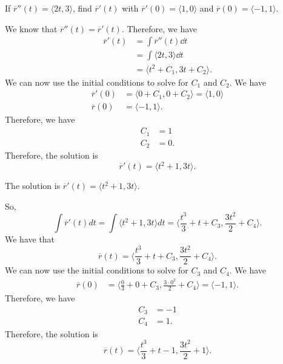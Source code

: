 \documentclass{article}
\begin{document}
\renewcommand{\familydefault}{\rmdefault}



\setcounter{page}{0}
\newpage
\tableofcontents
\newpage






\normalsize

\setcounter{page}{1}

\begin{examplebox}
If \( \overline{r}''(t) = \langle 2t, 3 \rangle \), find \( \overline{r}'(t) \) with \( \overline{r}'(0) = \langle 1, 0 \rangle \) and \( \overline{r}(0) = \langle -1, 1 \rangle \).
\begin{solutionbox}
We know that \( \overline{r}''(t) = \overline{r}'(t) \). Therefore, we have
\begin{align*}
    \overline{r}'(t) &= \int \overline{r}''(t) \dd{t} \\
    &= \int \langle 2t, 3 \rangle \dd{t} \\
    &= \langle t^2 + C_1, 3t + C_2 \rangle.
\end{align*}
We can now use the initial conditions to solve for \( C_1 \) and \( C_2 \). We have
\begin{align*}
    \overline{r}'(0) &= \langle 0 + C_1, 0 + C_2 \rangle = \langle 1, 0 \rangle \\
    \overline{r}(0) &= \langle -1, 1 \rangle.
\end{align*}
Therefore, we have
\begin{align*}
    C_1 &= 1 \\
    C_2 &= 0.
\end{align*}
Therefore, the solution is
\begin{equation*}
    \overline{r}'(t) = \langle t^2 + 1, 3t \rangle.
\end{equation*}
\begin{answerbox}
The solution is \( \overline{r}'(t) = \langle t^2 + 1, 3t \rangle \).
\end{answerbox}
\end{solutionbox}
\end{examplebox}
So,
\[
    \int \overline{r}'(t) dt = \int \langle t^2 + 1, 3t \rangle dt = \langle \frac{t^3}{3} + t + C_3, \frac{3t^2}{2} + C_4 \rangle.
\]
We have that
\[
    \overline{r}(t) = \langle \frac{t^3}{3} + t + C_3, \frac{3t^2}{2} + C_4 \rangle.
\]
We can now use the initial conditions to solve for \( C_3 \) and \( C_4 \). We have
\begin{align*}
    \overline{r}(0) &= \langle \frac{0}{3} + 0 + C_3, \frac{3 \cdot 0^2}{2} + C_4 \rangle = \langle -1, 1 \rangle.
\end{align*}
Therefore, we have
\begin{align*}
    C_3 &= -1 \\
    C_4 &= 1.
\end{align*}
Therefore, the solution is
\[
    \overline{r}(t) = \langle \frac{t^3}{3} + t - 1, \frac{3t^2}{2} + 1 \rangle.
\]
\end{document}
